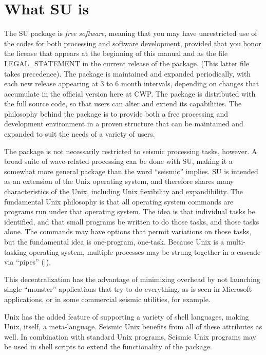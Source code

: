 \section{What SU is}

The SU package is {\em free software}, meaning that you may have
unrestricted use of the codes for both processing and software development,
provided that you honor the license that appears at the beginning of 
this manual and as the file LEGAL\_STATEMENT in the current release
of the package. (This latter file takes precedence).
The package is maintained and expanded periodically, with
each new release appearing at 3 to 6 month intervals, depending
on changes that accumulate in the official version here at CWP.
The package is distributed with the full source code, so that users
can alter and extend its capabilities.   The philosophy behind the package
is to provide both a free processing and development environment
in a proven structure that can be maintained and expanded to suit
the needs of a variety of users.

The package is not necessarily restricted to seismic processing tasks,
however.  A broad suite of wave-related processing can be done with SU,
making it a somewhat more general package than the word ``seismic'' implies.
SU is intended as an extension of the Unix operating system,
and therefore shares many characteristics of the Unix, including  Unix
flexibility and expandibility. 
The fundamental Unix philosophy is that all operating system commands
are programs run under that operating system.
The idea is that individual tasks be identified, and that small programs
be written to do those tasks, and those tasks alone.
The commands may have options that permit variations on those tasks,
but the fundamental idea is one-program, one-task.
Because Unix is a multi-tasking operating system, multiple processes
may be strung together in a cascade via ``pipes'' ($|$).

This decentralization has the advantage of minimizing overhead
by not launching single ``monster'' applications that try to do
everything, as is seen in Microsoft applications, or 
in some commercial seismic utilities, for example.

Unix has the added feature of supporting a variety of shell languages,
making Unix, itself, a meta-language. Seismic Unix benefits from all
of these attributes as well. In combination with standard Unix
programs, Seismic Unix programs may be used in shell scripts to
extend the functionality of the package.

